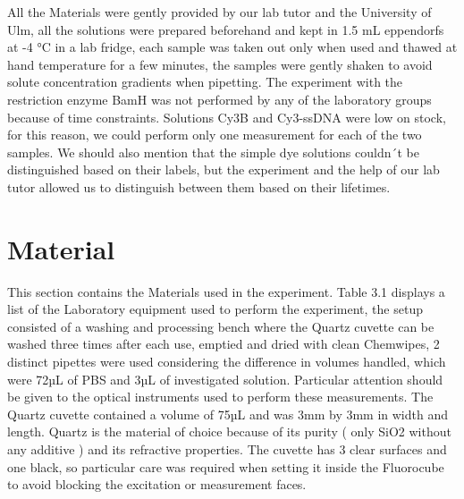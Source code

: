 \documentclass[a4paper,english,12pt,bibliography=totoc]{scrreprt}
\begin{document}
All the Materials were gently provided by our lab tutor and the University of Ulm, all the solutions were prepared beforehand and kept in 1.5 mL eppendorfs at -4 °C in a lab fridge, each sample was taken out only when used and thawed at hand temperature for a few minutes, the samples were gently shaken to avoid solute concentration gradients when pipetting.
The experiment with the restriction enzyme BamH was not performed by any of the laboratory groups because of time constraints. Solutions Cy3B and Cy3-ssDNA were low on stock, for this reason, we could perform only one measurement for each of the two samples.
We should also mention that the simple dye solutions couldn´t be distinguished based on their labels, but the experiment and the help of our lab tutor allowed us to distinguish between them based on their lifetimes.
\section{Material}
\label{sec:material}

This section contains the Materials used in the experiment.
Table 3.1 displays a list of the Laboratory equipment used to perform the experiment, the setup consisted of a washing and processing bench where the Quartz cuvette can be washed three times after each use, emptied and dried with clean Chemwipes, 2 distinct pipettes were used considering the difference in volumes handled, which were 72µL of PBS and 3µL of investigated solution.
Particular attention should be given to the optical instruments used to perform these measurements. 
The Quartz cuvette contained a volume of 75µL and was 3mm by 3mm in width and length. Quartz is the material of choice because of its purity ( only SiO2 without any additive ) and its refractive properties.
The cuvette has 3 clear surfaces and one black, so particular care was required when setting it inside the Fluorocube to avoid blocking the excitation or measurement faces.
\end{document}
